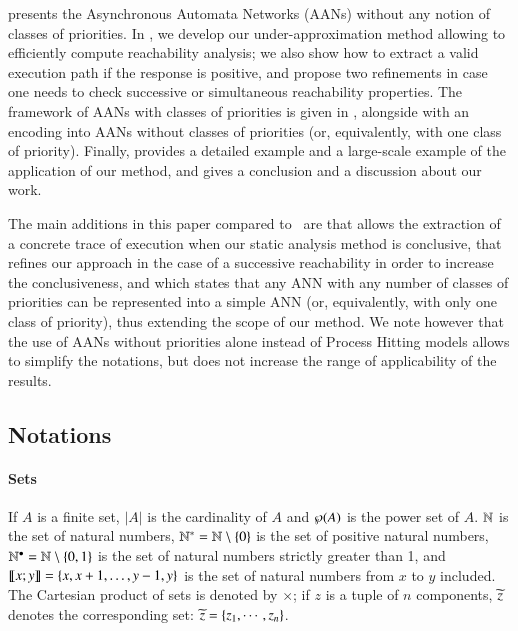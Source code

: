  presents the Asynchronous Automata Networks (AANs)
without any notion of classes of priorities.
In ,
we develop our under-approximation method allowing to efficiently
compute reachability analysis;
we also show how to extract a valid execution path if the response is positive,
and propose two refinements in case one needs to check
successive or simultaneous reachability properties.
The framework of AANs with classes of priorities is given in ,
alongside with an encoding into AANs without classes of priorities
(or, equivalently, with one class of priority).
Finally,  provides a detailed example and a large-scale example
of the application of our method,
and  gives a conclusion and a discussion about our work.

The main additions in this paper compared to~\cite{FPMR13-CS2Bio} are
 that allows the extraction of a concrete trace of execution
when our static analysis method is conclusive,
 that refines our approach in the case
of a successive reachability in order to increase the conclusiveness,
and  which states that any ANN
with any number of classes of priorities
can be represented into a simple ANN
(or, equivalently, with only one class of priority),
thus extending the scope of our method.
We note however that the use of AANs without priorities alone
instead of Process Hitting models
allows to simplify the notations, but does not increase
the range of applicability of the results.



\subsection*{Notations}
\label{notations}

\paragraph*{Sets}
If $A$ is a finite set,
$|A|$ is the cardinality of $A$
and $\wp(A)$ is the power set of $A$.
$\mathbb{N}$ is the set of natural numbers,
$\mathbb{N}^* = \mathbb{N} \setminus \{ 0 \}$ is the set of positive natural numbers,
$\mathbb{N}^\bullet = \mathbb{N} \setminus \{ 0, 1 \}$ is the set of natural numbers strictly greater than 1,
and $\llbracket x; y \rrbracket = \{ x, x+1, \dots, y-1, y \}$ is the set of natural numbers from $x$ to $y$ included.
The Cartesian product of sets is denoted by $\times$;
if $z$ is a tuple of $n$ components, $\widetilde{z}$ denotes the corresponding set:
$\widetilde{z} = \{z_1, \cdots, z_n\}$.

